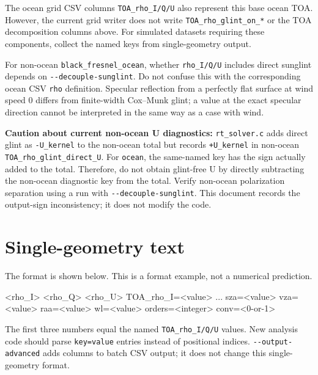 The ocean grid CSV columns \texttt{TOA\_\allowbreak{}rho\_\allowbreak{}I/\allowbreak{}Q/\allowbreak{}U} also represent this base ocean TOA. However, the current grid writer does not write \texttt{TOA\_\allowbreak{}rho\_\allowbreak{}glint\_\allowbreak{}on\_\allowbreak{}*} or the TOA decomposition columns above. For simulated datasets requiring these components, collect the named keys from single-geometry output.

For non-ocean \texttt{black\_\allowbreak{}fresnel\_\allowbreak{}ocean}, whether \texttt{rho\_\allowbreak{}I/\allowbreak{}Q/\allowbreak{}U} includes direct sunglint depends on \texttt{-\allowbreak{}-\allowbreak{}decouple-\allowbreak{}sunglint}. Do not confuse this with the corresponding ocean CSV \texttt{rho} definition. Specular reflection from a perfectly flat surface at wind speed 0 differs from finite-width Cox--Munk glint; a value at the exact specular direction cannot be interpreted in the same way as a case with wind.

\textbf{Caution about current non-ocean U diagnostics:} \texttt{rt\_\allowbreak{}solver.\allowbreak{}c} adds direct glint as \texttt{-U\_\allowbreak{}kernel} to the non-ocean total but records \texttt{+U\_\allowbreak{}kernel} in non-ocean \texttt{TOA\_\allowbreak{}rho\_\allowbreak{}glint\_\allowbreak{}direct\_\allowbreak{}U}. For \texttt{ocean}, the same-named key has the sign actually added to the total. Therefore, do not obtain glint-free U by directly subtracting the non-ocean diagnostic key from the total. Verify non-ocean polarization separation using a run with \texttt{-\allowbreak{}-\allowbreak{}decouple-\allowbreak{}sunglint}. This document records the output-sign inconsistency; it does not modify the code.

\section{Single-geometry text}
\label{sec:auto:05_output_formats:4}
The format is shown below. This is a format example, not a numerical prediction.


\begin{ManualCode}
<rho_I> <rho_Q> <rho_U>  TOA_rho_I=<value> ... sza=<value> vza=<value> raa=<value> wl=<value> orders=<integer> conv=<0-or-1>
\end{ManualCode}

The first three numbers equal the named \texttt{TOA\_\allowbreak{}rho\_\allowbreak{}I/\allowbreak{}Q/\allowbreak{}U} values. New analysis code should parse \texttt{key=\allowbreak{}value} entries instead of positional indices. \texttt{-\allowbreak{}-\allowbreak{}output-\allowbreak{}advanced} adds columns to batch CSV output; it does not change this single-geometry format.

